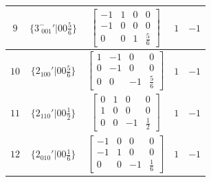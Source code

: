 \documentclass[fleqn,8pt]{jsarticle}
\begin{document}
\begin{longtable}{ccccc}
$ 9 $ & $ \{3^{-}_{\,\,001}{}'|0 0 \frac{5}{6}\} $ & $ \begin{bmatrix} -1 & 1 & 0 & 0 \\ -1 & 0 & 0 & 0 \\ 0 & 0 & 1 & \frac{5}{6} \end{bmatrix} $ & $ 1 $ & $ -1 $ \\ \hline
$ 10 $ & $ \{2{}_{100}{}'|0 0 \frac{5}{6}\} $ & $ \begin{bmatrix} 1 & -1 & 0 & 0 \\ 0 & -1 & 0 & 0 \\ 0 & 0 & -1 & \frac{5}{6} \end{bmatrix} $ & $ 1 $ & $ -1 $ \\ \hline
$ 11 $ & $ \{2{}_{110}{}'|0 0 \frac{1}{2}\} $ & $ \begin{bmatrix} 0 & 1 & 0 & 0 \\ 1 & 0 & 0 & 0 \\ 0 & 0 & -1 & \frac{1}{2} \end{bmatrix} $ & $ 1 $ & $ -1 $ \\ \hline
$ 12 $ & $ \{2{}_{010}{}'|0 0 \frac{1}{6}\} $ & $ \begin{bmatrix} -1 & 0 & 0 & 0 \\ -1 & 1 & 0 & 0 \\ 0 & 0 & -1 & \frac{1}{6} \end{bmatrix} $ & $ 1 $ & $ -1 $ \\
\end{longtable}
\end{document}
